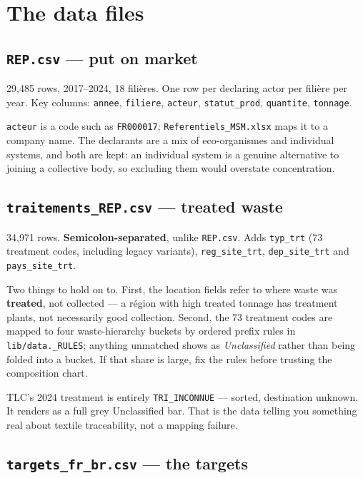 \documentclass[11pt,a4paper]{article}
\newcommand{\file}[1]{\texttt{#1}}
\begin{document}
\section{The data files}

\subsection{\file{REP.csv} --- put on market}

29{,}485 rows, 2017--2024, 18 filières. One row per declaring actor per filière
per year. Key columns: \file{annee}, \file{filiere}, \file{acteur},
\file{statut\_prod}, \file{quantite}, \file{tonnage}.

\file{acteur} is a code such as \file{FR000017}; \file{Referentiels\_MSM.xlsx}
maps it to a company name. The declarants are a mix of eco-organismes and
individual systems, and both are kept: an individual system is a genuine
alternative to joining a collective body, so excluding them would overstate
concentration.

\subsection{\file{traitements\_REP.csv} --- treated waste}

34{,}971 rows. \textbf{Semicolon-separated}, unlike \file{REP.csv}. Adds
\file{typ\_trt} (73 treatment codes, including legacy variants),
\file{reg\_site\_trt}, \file{dep\_site\_trt} and \file{pays\_site\_trt}.

Two things to hold on to. First, the location fields refer to where waste was
\textbf{treated}, not collected --- a région with high treated tonnage has
treatment plants, not necessarily good collection. Second, the 73 treatment
codes are mapped to four waste-hierarchy buckets by ordered prefix rules in
\file{lib/data.\_RULES}; anything unmatched shows as \emph{Unclassified} rather
than being folded into a bucket. If that share is large, fix the rules before
trusting the composition chart.

TLC's 2024 treatment is entirely \file{TRI\_INCONNUE} --- sorted, destination
unknown. It renders as a full grey Unclassified bar. That is the data telling
you something real about textile traceability, not a mapping failure.

\subsection{\file{targets\_fr\_br.csv} --- the targets}
\end{document}
